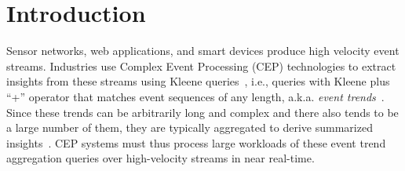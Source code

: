 \section{Introduction}
\label{sec:introduction}

Sensor networks, web applications, and smart devices produce high velocity event streams. Industries use Complex Event Processing (CEP) technologies to extract insights from these streams using Kleene queries~\cite{ADGI08,Giatrakos2020,ZDI14},
i.e., queries with Kleene plus ``+'' operator that matches event sequences of any length, a.k.a. \textit{event trends}~\cite{PLAR17}. Since these trends can be arbitrarily long and complex and there also tends to be a large number of them, they are typically aggregated to derive summarized insights~\cite{QCRR14}. CEP systems must thus process large workloads of these event trend aggregation queries over high-velocity streams in near real-time.

